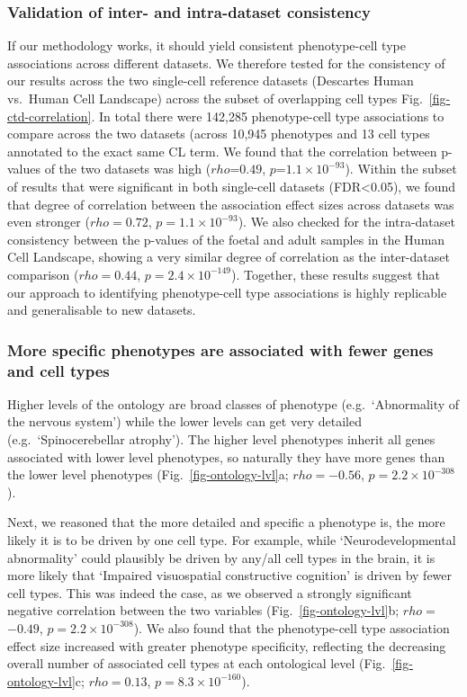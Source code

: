 \documentclass[
]{article}
\begin{document}
\subsubsection{Validation of inter- and intra-dataset
consistency}\label{validation-of-inter--and-intra-dataset-consistency}

If our methodology works, it should yield consistent phenotype-cell type
associations across different datasets. We therefore tested for the
consistency of our results across the two single-cell reference datasets
(Descartes Human vs.~Human Cell Landscape) across the subset of
overlapping cell types Fig.~\ref{fig-ctd-correlation}. In total there
were 142,285 phenotype-cell type associations to compare across the two
datasets (across 10,945 phenotypes and 13 cell types annotated to the
exact same CL term. We found that the correlation between p-values of
the two datasets was high (\(rho\)=\(0.49\),
\(p\)=\(1.1 \times 10^{-93}\)). Within the subset of results that were
significant in both single-cell datasets (FDR\textless0.05), we found
that degree of correlation between the association effect sizes across
datasets was even stronger (\(rho=\)\(0.72\),
\(p=\)\(1.1 \times 10^{-93}\)). We also checked for the intra-dataset
consistency between the p-values of the foetal and adult samples in the
Human Cell Landscape, showing a very similar degree of correlation as
the inter-dataset comparison (\(rho=\)\(0.44\),
\(p=\)\(2.4 \times 10^{-149}\)). Together, these results suggest that
our approach to identifying phenotype-cell type associations is highly
replicable and generalisable to new datasets.

\subsubsection{More specific phenotypes are associated with fewer genes
and cell
types}\label{more-specific-phenotypes-are-associated-with-fewer-genes-and-cell-types}

Higher levels of the ontology are broad classes of phenotype
(e.g.~`Abnormality of the nervous system') while the lower levels can
get very detailed (e.g.~`Spinocerebellar atrophy'). The higher level
phenotypes inherit all genes associated with lower level phenotypes, so
naturally they have more genes than the lower level phenotypes
(Fig.~\ref{fig-ontology-lvl}a; \(rho=\)\(-0.56\),
\(p=\)\(2.2 \times 10^{-308}\)).

Next, we reasoned that the more detailed and specific a phenotype is,
the more likely it is to be driven by one cell type. For example, while
`Neurodevelopmental abnormality' could plausibly be driven by any/all
cell types in the brain, it is more likely that `Impaired visuospatial
constructive cognition' is driven by fewer cell types. This was indeed
the case, as we observed a strongly significant negative correlation
between the two variables (Fig.~\ref{fig-ontology-lvl}b;
\(rho=\)\(-0.49\), \(p=\)\(2.2 \times 10^{-308}\)). We also found that
the phenotype-cell type association effect size increased with greater
phenotype specificity, reflecting the decreasing overall number of
associated cell types at each ontological level
(Fig.~\ref{fig-ontology-lvl}c; \(rho=\)\(0.13\),
\(p=\)\(8.3 \times 10^{-160}\)).
\end{document}
